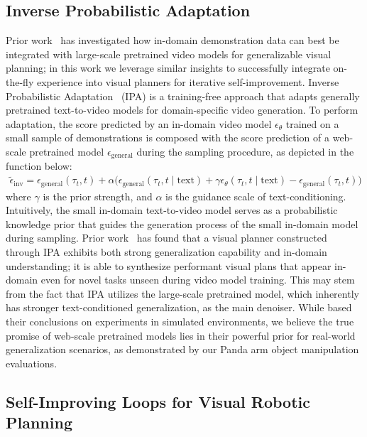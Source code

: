 \subsection{Inverse Probabilistic Adaptation}
\label{sec:method_probadap}
Prior work~\citep{luo2025solving} has investigated how in-domain demonstration data can best be integrated with large-scale pretrained video models for generalizable visual planning; in this work we leverage similar insights to successfully integrate on-the-fly experience into visual planners for iterative self-improvement.  Inverse Probabilistic Adaptation~\citep{luo2025solving, yang2023probabilistic} (IPA) is a training-free approach that adapts generally pretrained text-to-video models for domain-specific video generation.  To perform adaptation, the score predicted by an in-domain video model $\epsilon_{\theta}$ trained on a small sample of demonstrations is composed with the score prediction of a web-scale pretrained model $\epsilon_{\text{general}}$ during the sampling procedure, as depicted in the function below:
\begin{align}
    \tilde{\epsilon}_{\text{inv}} = \epsilon_{\text{general}}(\tau_t, t) + \alpha\Big(\epsilon_{\text{general}}(\tau_t, t \mid \text{text}) + \gamma \epsilon_{\theta}(\tau_t, t \mid \text{text}) - \epsilon_{\text{general}}(\tau_t, t)\Big)
    \label{eq:inv_probadap}
\end{align}
where $\gamma$ is the prior strength, and $\alpha$ is the guidance scale of text-conditioning.  Intuitively, the small in-domain text-to-video model serves as a probabilistic knowledge prior that guides the generation process of the small in-domain model during sampling.  Prior work~\citep{luo2025solving} has found that a visual planner constructed through IPA exhibits both strong generalization capability and in-domain understanding; it is able to synthesize performant visual plans that appear in-domain even for novel tasks unseen during video model training.  This may stem from the fact that IPA utilizes the large-scale pretrained model, which inherently has stronger text-conditioned generalization, as the main denoiser. While \citet{luo2025solving} based their conclusions on experiments in simulated environments, we believe the true promise of web-scale pretrained models lies in their powerful prior for real-world generalization scenarios, as demonstrated by our Panda arm object manipulation evaluations.


\subsection{Self-Improving Loops for Visual Robotic Planning}
\label{sec:sail}

